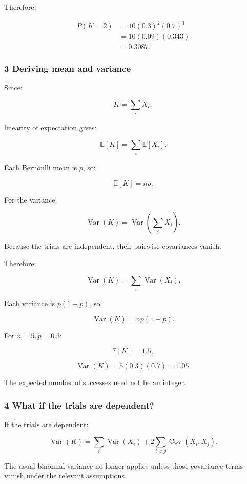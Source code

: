 Therefore:

\[
 \begin{aligned} P(K=2) &=10(0.3)^2(0.7)^3\\ &=10(0.09)(0.343)\\ &=\boxed{0.3087}. \end{aligned}
\]

\subsubsection{3 Deriving mean and variance}\label{02-foundations-ii-ch023-deriving-mean-and-variance}

Since:

\[
 K=\sum_iX_i,
\]

linearity of expectation gives:

\[
 \mathbb E[K]=\sum_i\mathbb E[X_i].
\]

Each Bernoulli mean is \(p\), so:

\[
 \boxed{\mathbb E[K]=np}.
\]

For the variance:

\[
 \operatorname{Var}(K) = \operatorname{Var}\left(\sum_iX_i\right).
\]

Because the trials are independent, their pairwise covariances vanish.

Therefore:

\[
 \operatorname{Var}(K)= \sum_i\operatorname{Var}(X_i).
\]

Each variance is \(p(1-p)\), so:

\[
 \boxed{ \operatorname{Var}(K)=np(1-p) }.
\]

For \(n=5,p=0.3\):

\[
 \mathbb E[K]=1.5,
\]

\[
 \operatorname{Var}(K)=5(0.3)(0.7)=1.05.
\]

The expected number of successes need not be an integer.

\subsubsection{4 What if the trials are dependent?}\label{02-foundations-ii-ch023-what-if-the-trials-are-dependent}

If the trials are dependent:

\[
 \operatorname{Var}(K)= \sum_i\operatorname{Var}(X_i) + 2\sum_{i<j}\operatorname{Cov}(X_i,X_j).
\]

The usual binomial variance no longer applies unless those covariance terms vanish under the relevant assumptions.

